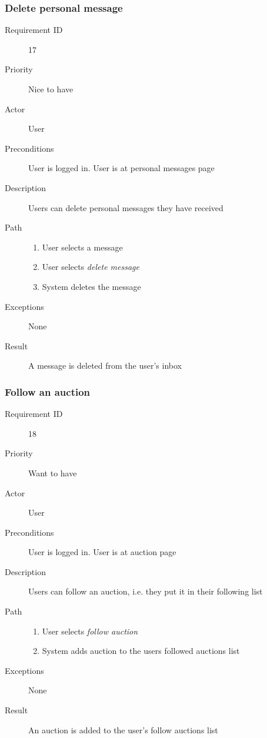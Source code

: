 		\subsubsection{Delete personal message}
			\begin{description}
				\item[Requirement ID] 17
				\item[Priority] Nice to have
				\item[Actor] User
				\item[Preconditions] User is logged in. User is at personal messages page
				\item[Description] Users can delete personal messages they have received
				\item[Path]
 					\begin{enumerate}
						\item User selects a message
						\item User selects \emph{delete message}
						\item System deletes the message
					\end{enumerate}
				\item[Exceptions] None
				\item[Result] A message is deleted from the user's inbox
			\end{description}
		\subsubsection{Follow an auction}
			\begin{description}
				\item[Requirement ID] 18
				\item[Priority] Want to have
				\item[Actor] User
				\item[Preconditions] User is logged in. User is at auction page
				\item[Description] Users can follow an auction, i.e. they put it in their following list
				\item[Path]
 					\begin{enumerate}
						\item User selects \emph{follow auction}
						\item System adds auction to the users followed auctions list
					\end{enumerate}
				\item[Exceptions] None
				\item[Result] An auction is added to the user's follow auctions list
			\end{description}
